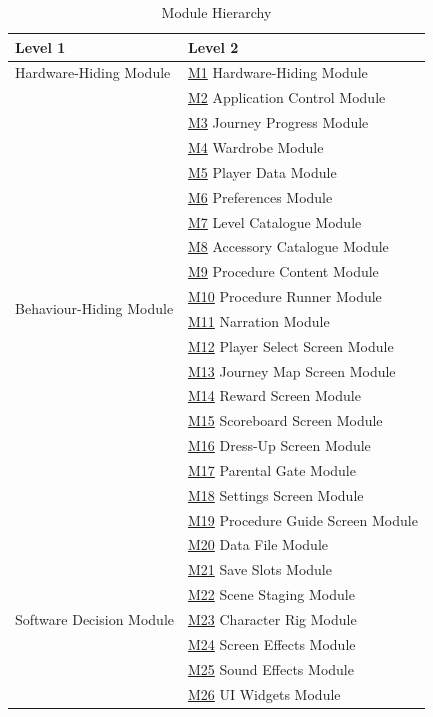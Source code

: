 \documentclass[10pt, titlepage]{article}
\newcommand{\misref}[2]{\hyperref[mis:#1]{M#2}}
\begin{document}
\begin{table}[H]
\caption{Module Hierarchy}
\label{TblMH}
\renewcommand{\arraystretch}{1.3}
\begin{tabularx}{\textwidth}{@{}p{}X@{}}
\toprule
\textbf{Level 1} & \textbf{Level 2} \\
\midrule
Hardware-Hiding Module & \misref{HH}{1} Hardware-Hiding Module \\
\midrule
\multirow{18}{0.31\textwidth}{Behaviour-Hiding Module}
& \misref{Control}{2} Application Control Module \\
& \misref{Progress}{3} Journey Progress Module \\
& \misref{Wardrobe}{4} Wardrobe Module \\
& \misref{PlayerData}{5} Player Data Module \\
& \misref{Prefs}{6} Preferences Module \\
& \misref{Levels}{7} Level Catalogue Module \\
& \misref{Accessories}{8} Accessory Catalogue Module \\
& \misref{Content}{9} Procedure Content Module \\
& \misref{Runner}{10} Procedure Runner Module \\
& \misref{Narration}{11} Narration Module \\
& \misref{PlayerSelect}{12} Player Select Screen Module \\
& \misref{Map}{13} Journey Map Screen Module \\
& \misref{Reward}{14} Reward Screen Module \\
& \misref{Scoreboard}{15} Scoreboard Screen Module \\
& \misref{DressUp}{16} Dress-Up Screen Module \\
& \misref{Gate}{17} Parental Gate Module \\
& \misref{Settings}{18} Settings Screen Module \\
& \misref{Guide}{19} Procedure Guide Screen Module \\
\midrule
\multirow{7}{0.31\textwidth}{Software Decision Module}
& \misref{DataFile}{20} Data File Module \\
& \misref{Slots}{21} Save Slots Module \\
& \misref{Staging}{22} Scene Staging Module \\
& \misref{Rig}{23} Character Rig Module \\
& \misref{Effects}{24} Screen Effects Module \\
& \misref{Sound}{25} Sound Effects Module \\
& \misref{Widgets}{26} UI Widgets Module \\
\bottomrule
\end{tabularx}
\end{table}
\end{document}
